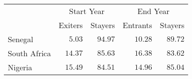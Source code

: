 \begin{longtable}{lrrrr}
\toprule
 & \multicolumn{2}{c}{Start Year} & \multicolumn{2}{c}{End Year} \\ 
\cmidrule(lr){2-3} \cmidrule(lr){4-5}
  & Exiters & Stayers & Entrants & Stayers \\ 
\midrule
Senegal & $5.03$ & $94.97$ & $10.28$ & $89.72$ \\ 
South Africa & $14.37$ & $85.63$ & $16.38$ & $83.62$ \\ 
Nigeria & $15.49$ & $84.51$ & $14.96$ & $85.04$ \\ 
\bottomrule
\end{longtable}


